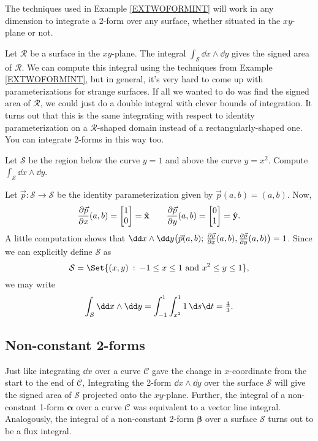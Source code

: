 The techniques used in Example \ref{EXTWOFORMINT} will work in any dimension
to integrate a 2-form over any surface, whether situated in the $xy$-plane or not.

Let $\mathcal R$ be a surface in the $xy$-plane.
The integral $\int_{\mathcal S}\dd x\wedge\dd y$ gives the 
signed area of $\mathcal R$.  We can compute this integral using the techniques
from Example \ref{EXTWOFORMINT}, but in general, it's very hard to come up
with parameterizations for strange surfaces.  If all we wanted to do was find
the signed area of $\mathcal R$, we could just do a double integral
with clever bounds of integration.  It turns out that this is the same 
integrating with respect to identity parameterization on a $\mathcal R$-shaped
domain instead of a rectangularly-shaped one.  You can integrate 2-forms in this
way too.

\begin{example}
	Let $\mathcal S$ be the region below the curve $y=1$ and above the
	curve $y=x^2$.  Compute $\int_{\mathcal S} \dd x\wedge \dd y$.

	Let $\vec p:\mathcal S\to\mathcal S$ be the identity parameterization
	given by $\vec p(a,b)=(a,b)$.  Now,
	\[
	\frac{\partial \vec p}{\partial x} (a,b) = \mat{1\\ 0}=\xhat \qquad
	\frac{\partial \vec p}{\partial y} (a,b) = \mat{0\\ 1}=\yhat.
	\]
	A little computation shows that $\dd x\wedge \dd y\formarg{\vec p(a,b)}{
	\tfrac{\partial \vec p}{\partial x} (a,b), \tfrac{\partial \vec p}{\partial y} (a,b)}
	= 1$.  Since we can explicitly define $\mathcal S$ as
	\[
		\mathcal S = \Set{(x,y)\given -1\leq x\leq 1\text{ and }x^2\leq y\leq 1},
	\]
	we may write
	\[
		\int_{\mathcal S} \dd x\wedge \dd y = \int_{-1}^1 \int_{x^2}^1
		1\,\d s\d t = \tfrac{4}{3}.
	\]
\end{example}

\subsection{Non-constant 2-forms}

Just like integrating $\dd x$ over a curve $\mathcal C$
gave the change in $x$-coordinate from the start to the end of $\mathcal C$,
Integrating the 2-form $\dd x\wedge \dd y$ over the surface $\mathcal S$ will
give the signed area of $\mathcal S$ projected onto the $xy$-plane.
Further, the integral of a non-constant 1-form $\bm \alpha$ over a curve $\mathcal C$
was equivalent to a vector line integral.  Analogously, the integral
of a non-constant 2-form $\bm\beta$ over a surface $\mathcal S$ turns out
to be a flux integral.

